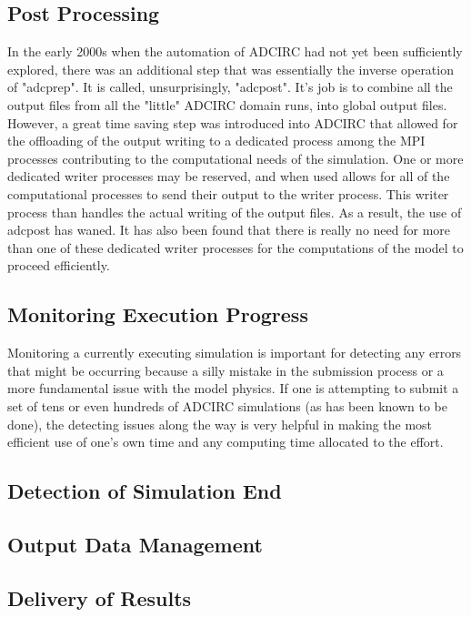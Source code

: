 \documentclass{article}
\begin{document}
\subsection{Post Processing}

In the early 2000s when the automation of ADCIRC had not yet been sufficiently
explored, there was an additional step that was essentially the inverse
operation of "adcprep". It is called, unsurprisingly, "adcpost". It's job is to
combine all the output files from all the "little" ADCIRC domain runs, into
global output files. However, a great time saving step was introduced into
ADCIRC that allowed for the offloading of the output writing to a dedicated
process among the MPI processes contributing to the computational needs of the
simulation. One or more dedicated writer processes may be reserved, and when
used allows for all of the computational processes to send their output to the
writer process. This writer process than handles the actual writing of the
output files. As a result, the use of adcpost has waned.  It has also been found
that there is really no need for more than one of these dedicated writer
processes for the computations of the model to proceed efficiently.

\subsection{Monitoring Execution Progress}

Monitoring a currently executing simulation is important for detecting any
errors that might be occurring because a silly mistake in the submission process
or a more fundamental issue with the model physics. If one is attempting to
submit a set of tens or even hundreds of ADCIRC simulations (as has been known
to be done), the detecting issues along the way is very helpful in making the
most efficient use of one's own time and any computing time allocated to the
effort.

\subsection{Detection of Simulation End}

\subsection{Output Data Management}

\subsection{Delivery of Results}
\end{document}
